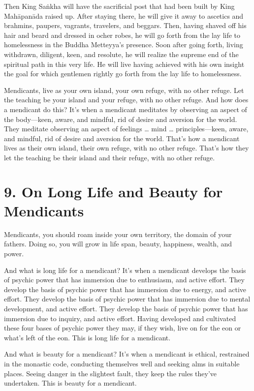 \documentclass[12pt,openany]{book}%
\begin{document}
Then King \textsanskrit{Saṅkha} will have the sacrificial post that had been built by King \textsanskrit{Mahāpanāda} raised up. After staying there, he will give it away to ascetics and brahmins, paupers, vagrants, travelers, and beggars. Then, having shaved off his hair and beard and dressed in ocher robes, he will go forth from the lay life to homelessness in the Buddha Metteyya’s presence. Soon after going forth, living withdrawn, diligent, keen, and resolute, he will realize the supreme end of the spiritual path in this very life. He will live having achieved with his own insight the goal for which gentlemen rightly go forth from the lay life to homelessness. 

Mendicants, live as your own island, your own refuge, with no other refuge. Let the teaching be your island and your refuge, with no other refuge. And how does a mendicant do this? It’s when a mendicant meditates by observing an aspect of the body—keen, aware, and mindful, rid of desire and aversion for the world. They meditate observing an aspect of feelings … mind … principles—keen, aware, and mindful, rid of desire and aversion for the world. That’s how a mendicant lives as their own island, their own refuge, with no other refuge. That’s how they let the teaching be their island and their refuge, with no other refuge. 

\section*{9. On Long Life and Beauty for Mendicants }

Mendicants, you should roam inside your own territory, the domain of your fathers. Doing so, you will grow in life span, beauty, happiness, wealth, and power. 

And what is long life for a mendicant? It’s when a mendicant develops the basis of psychic power that has immersion due to enthusiasm, and active effort. They develop the basis of psychic power that has immersion due to energy, and active effort. They develop the basis of psychic power that has immersion due to mental development, and active effort. They develop the basis of psychic power that has immersion due to inquiry, and active effort. Having developed and cultivated these four bases of psychic power they may, if they wish, live on for the eon or what’s left of the eon. This is long life for a mendicant. 

And what is beauty for a mendicant? It’s when a mendicant is ethical, restrained in the monastic code, conducting themselves well and seeking alms in suitable places. Seeing danger in the slightest fault, they keep the rules they’ve undertaken. This is beauty for a mendicant. 
\end{document}
